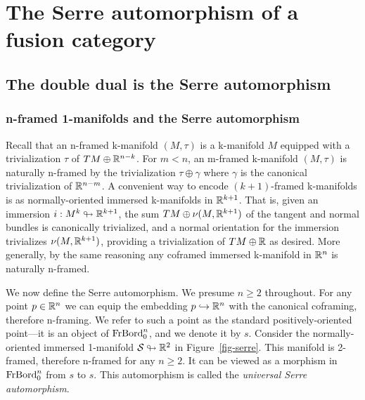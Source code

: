 \documentclass{amsart}
\begin{document}


\section{The Serre automorphism of a fusion category} \label{sec-serre}




\subsection{The double dual is the Serre automorphism} \label{sec-serre-dd}



\subsubsection{n-framed 1-manifolds and the Serre automorphism} \label{sec-serre-oneman}

Recall that an n-framed k-manifold $(M,\tau)$ is a k-manifold $M$ equipped with a trivialization $\tau$ of $TM \oplus \mathbb R^{n-k}$.  For $m < n$, an m-framed k-manifold $(M,\tau)$ is naturally n-framed by the trivialization $\tau \oplus \gamma$ where $\gamma$ is the canonical trivialization of $\mathbb R^{n-m}$.  A convenient way to encode $(k+1)$-framed k-manifolds is as normally-oriented immersed k-manifolds in $\mathbb R^{k+1}$.  That is, given an immersion $i: M^k \looparrowright \mathbb R^{k+1}$, the sum $TM \oplus \nu(M,\mathbb R^{k+1})$ of the tangent and normal bundles is canonically trivialized, and a normal orientation for the immersion trivializes $\nu(M,\mathbb R^{k+1})$, providing a trivialization of $TM \oplus \mathbb R$ as desired.  More generally, by the same reasoning any coframed immersed k-manifold in $\mathbb R^n$ is naturally n-framed.

We now define the Serre automorphism.  We presume $n \geq 2$ throughout.  For any point $p \in \mathbb R^n$ we can equip the embedding $p \hookrightarrow \mathbb R^n$ with the canonical coframing, therefore n-framing.  We refer to such a point as the standard positively-oriented point---it is an object of $\mathrm{FrBord}_0^n$, and we denote it by $s$.  Consider the normally-oriented immersed 1-manifold $\mathcal S \looparrowright \mathbb R^2$ in Figure~\ref{fig-serre}.  This manifold is 2-framed, therefore n-framed for any $n \geq 2$.  It can be viewed as a morphism in $\mathrm{FrBord}_0^n$ from $s$ to $s$.  This automorphism is called the \emph{universal Serre automorphism}.  
\end{document}
